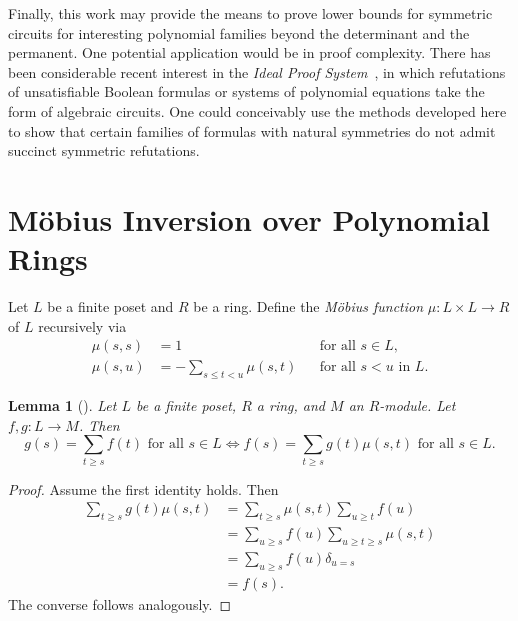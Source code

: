 \documentclass[11pt, DIV=15]{scrarticle}
\theoremstyle{definition}
\theoremstyle{plain}
\newtheorem{lemma}[definition]{Lemma}
\theoremstyle{remark}
\begin{document}
Finally, this work may provide the means to prove lower bounds for
symmetric circuits for interesting polynomial families beyond the
determinant and the permanent.  One potential application would be in
proof complexity.  There has been considerable recent interest in the
\emph{Ideal Proof System}~\cite{grochow_pitassi}, in which refutations of unsatisfiable Boolean formulas or systems of polynomial equations take the
form of algebraic circuits.  One could conceivably use the methods
developed here to show that certain families of formulas with natural
symmetries do not admit succinct symmetric refutations.

	
	
	
	
	
	
	
	\newpage
	\printbibliography
	\newpage
	
	\appendix 
	
	\section{Möbius Inversion over Polynomial Rings}
	
	Let $L$ be a finite poset and $R$ be a ring.
	Define the \emph{Möbius function} $\mu \colon L \times L \to R$ of $L$ recursively via
	\begin{align*}
		\mu(s,s) &= 1 && \text{for all } s \in L, \\
		\mu(s,u) &= - \sum_{s \leq t < u} \mu(s, t) && \text{for all } s < u \text{ in } L.
	\end{align*}
	
	\begin{lemma}[{\cite[Proposition~3.7.2]{stanley_enumerative_1997}}]\label{lem:moebius}
		Let $L$ be a finite poset, $R$ a ring, and $M$ an $R$-module.
		Let $f, g \colon L \to M$. Then
		\[
		g(s) = \sum_{t \geq s} f(t) \text{ for all } s\in L
		\iff
		f(s) = \sum_{t \geq s} g(t) \mu(s,t) \text{ for all } s \in L.
		\]
	\end{lemma}
	\begin{proof}
		Assume the first identity holds. Then
		\begin{align*}
			\sum_{t \geq s} g(t) \mu(s,t) &= \sum_{t \geq s} \mu(s,t) \sum_{u \geq t} f(u) \\
			&= \sum_{u \geq s} f(u) \sum_{u \geq t \geq s} \mu(s, t) \\ 
			&= \sum_{u \geq s} f(u) \delta_{u = s} \\
			&= f(s).
		\end{align*}
		The converse follows analogously.
	\end{proof}
\end{document}
